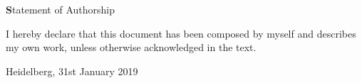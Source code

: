 \documentclass{thesisclass}
\begin{document}
\newsavebox{\saveBoxOne}
\newsavebox{\saveBoxTwo}
\newsavebox{\saveBoxThree}
\newsavebox{\saveBoxFour}
\newsavebox{\saveBoxFive}
\newsavebox{\saveBoxSix}
\newsavebox{\saveBoxSeven}
\newsavebox{\saveBoxEight}


\frontmatter
{}

\blankpage


\thispagestyle{plain}

\vspace*{\fill}

\centerline{\textbf Statement of Authorship}

\vspace{0.25cm}

I hereby declare that this document has been composed by myself and describes my own work, unless otherwise acknowledged in the text.

\vspace{2.5cm}

\hspace{0.25cm} Heidelberg, 31st January 2019

\vspace{2cm}

\blankpage


\thispagestyle{plain}
\end{document}
